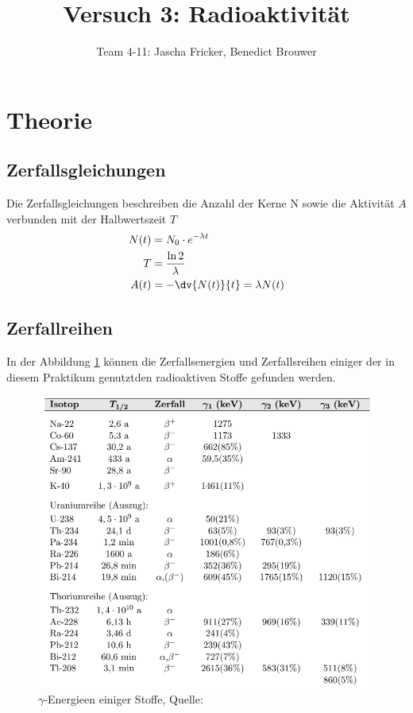 \documentclass[11pt, a4paper]{article}
\title{Versuch 3: Radioaktivität}
\author{Team 4-11: Jascha Fricker, Benedict Brouwer}
\begin{document}
    \maketitle

    \tableofcontents

    \newpage

    \section{Theorie}
    \subsection{Zerfallsgleichungen}
    Die Zerfallsgleichungen beschreiben die Anzahl der Kerne N sowie die Aktivität $A$ verbunden mit der Halbwertszeit $T$
    \begin{align}
        N(t) &= N_0 \cdot e^{- \lambda t} \\
        T &= \frac{\ln 2}{\lambda} \label{eq:Halbwertszeit}  \\ 
        A(t) &= - \dv{N(t)}{t} = \lambda N(t) \label{Aktivität-halb}
    \end{align}

    \subsection{Zerfallreihen}
    In der Abbildung \ref{fig:zerf} können die Zerfallsenergien und Zerfallsreihen einiger der in diesem Praktikum genutztden radioaktiven Stoffe gefunden werden.

    \begin{figure}[!h]
        \centering
        \includegraphics[width=\textwidth]{Screenshot 2023-03-14 5.37.47 PM.png}

        \caption{$\gamma$-Energieen einiger Stoffe, Quelle: \cite{RAD}}
        \label{fig:zerf}
    \end{figure}
    
\end{document}
